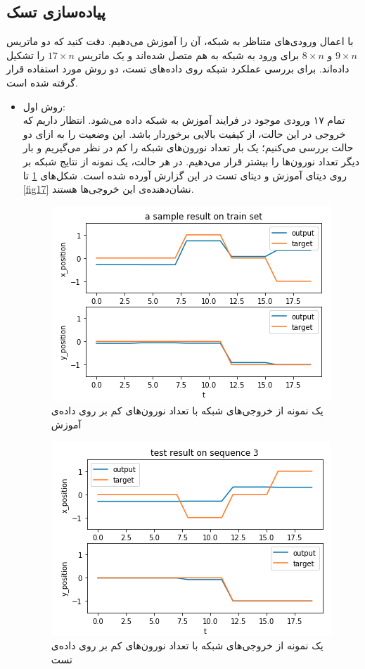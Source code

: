 \documentclass[a4paper]{article}
\begin{document}
\subsection{پیاده‌سازی تسک}
با اعمال ورودی‌های متناظر به شبکه، آن را آموزش می‌دهیم. دقت کنید که دو ماتریس $9\times n$ و $8\times n$ برای ورود به شبکه به هم متصل شده‌اند و یک ماتریس $17\times n$ را تشکیل داده‌اند. برای بررسی عملکرد شبکه روی داده‌های تست، دو روش مورد استفاده قرار گرفته شده است. 
\begin{itemize}
	\item روش اول:\\
	تمام ۱۷ ورودی موجود در فرایند آموزش به شبکه داده می‌شود. انتظار داریم که خروجی در این حالت، از کیفیت بالایی برخوردار باشد. این وضعیت را به ازای دو حالت بررسی می‌کنیم؛ یک بار تعداد نورون‌های شبکه را کم در نظر می‌گیریم و بار دیگر تعداد نورون‌ها را بیشتر قرار می‌دهیم. در هر حالت، یک نمونه از نتایج شبکه بر روی دیتای آموزش و دیتای تست در این گزارش آورده شده است. شکل‌های \ref{fig14} تا \ref{fig17} نشان‌دهنده‌ی این خروجی‌ها هستند.
	
	\begin{figure}[h!]
		\centering
		\includegraphics[scale=0.7]{fig14.png}
		\caption{یک نمونه از خروجی‌های شبکه با تعداد نورون‌های کم بر روی داده‌ی آموزش}
		\label{fig14}
	\end{figure}
	
		\begin{figure}[h!]
		\centering
		\includegraphics[scale=0.7]{fig15.png}
		\caption{یک نمونه از خروجی‌های شبکه با تعداد نورون‌های کم بر روی داده‌ی تست}
		\label{fig15}
	\end{figure}
	

\end{itemize}
\end{document}
